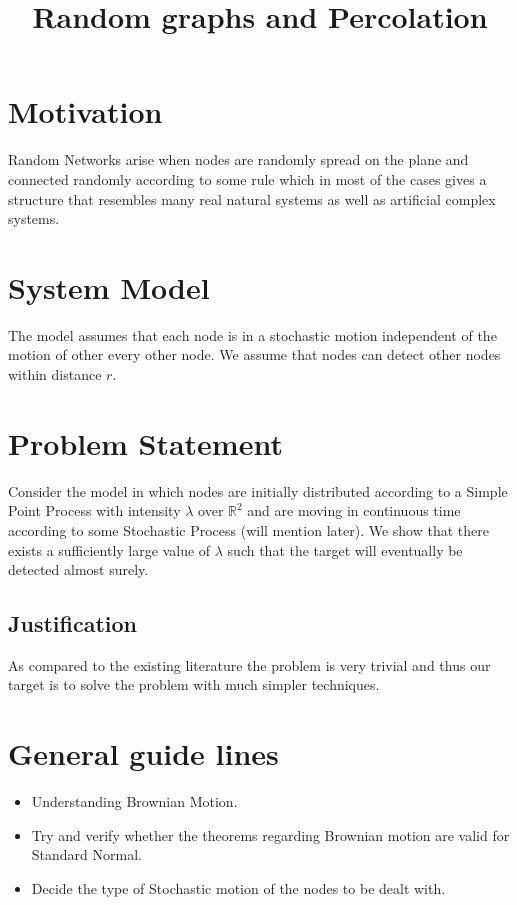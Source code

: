 \documentclass[a4paper,english,12pt]{article}
\title{Random graphs and Percolation}
\author{}
\begin{document}
\maketitle

\section{Motivation}
Random Networks arise when nodes are randomly spread on the plane and connected randomly according to some rule which in most of the cases gives a structure that resembles many real natural systems as well as artificial complex systems.
\section{System Model}
The model assumes that each node is in a stochastic motion independent of the motion of other every other node. We assume that nodes can detect other nodes within distance $r$. 
\section{Problem Statement}
Consider the model in which nodes are initially distributed according to a Simple Point Process with intensity $\lambda$ over $\mathbb{R}^2$ and are moving in continuous time according to some Stochastic Process (will mention later). We show that there exists a sufficiently large value of $\lambda$ such that the target will eventually be detected almost surely.
\subsection{Justification}
As compared to the existing literature the problem is very trivial and thus our target is to solve the problem with much simpler techniques.
\newpage
\section{General guide lines}
\begin{itemize}
\item Understanding Brownian Motion.
\item Try and verify whether the theorems regarding Brownian motion are valid for Standard Normal.
\item Decide the type of Stochastic motion of the nodes to be dealt with.
\end{itemize}
\end{document}
